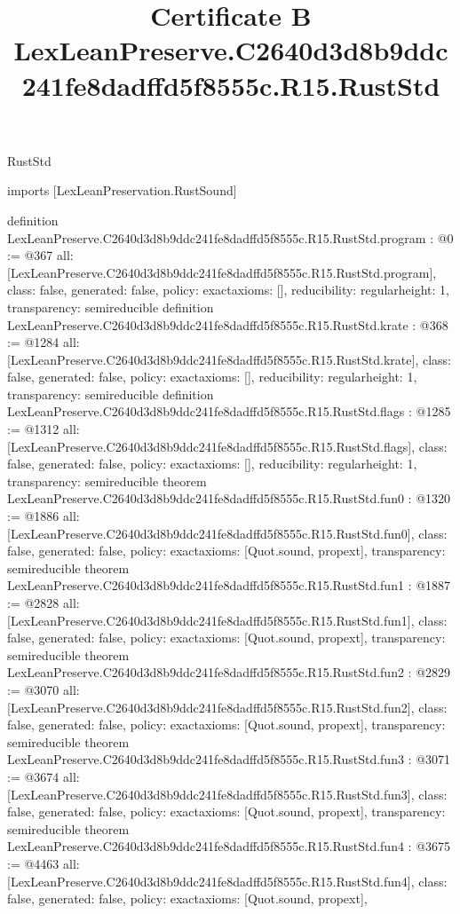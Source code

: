 \begin{lexlean}{RustStd}
\title{Certificate B LexLeanPreserve.C2640d3d8b9ddc241fe8dadffd5f8555c.R15.RustStd}
\begin{coremodule}
imports [LexLeanPreservation.RustSound]

definition LexLeanPreserve.C2640d3d8b9ddc241fe8dadffd5f8555c.R15.RustStd.program : @0 := @367 {
  all: [LexLeanPreserve.C2640d3d8b9ddc241fe8dadffd5f8555c.R15.RustStd.program],
  class: false,
  generated: false,
  policy: exact{axioms: []},
  reducibility: regular{height: 1},
  transparency: semireducible
}
definition LexLeanPreserve.C2640d3d8b9ddc241fe8dadffd5f8555c.R15.RustStd.krate : @368 := @1284 {
  all: [LexLeanPreserve.C2640d3d8b9ddc241fe8dadffd5f8555c.R15.RustStd.krate],
  class: false,
  generated: false,
  policy: exact{axioms: []},
  reducibility: regular{height: 1},
  transparency: semireducible
}
definition LexLeanPreserve.C2640d3d8b9ddc241fe8dadffd5f8555c.R15.RustStd.flags : @1285 := @1312 {
  all: [LexLeanPreserve.C2640d3d8b9ddc241fe8dadffd5f8555c.R15.RustStd.flags],
  class: false,
  generated: false,
  policy: exact{axioms: []},
  reducibility: regular{height: 1},
  transparency: semireducible
}
theorem LexLeanPreserve.C2640d3d8b9ddc241fe8dadffd5f8555c.R15.RustStd.fun0 : @1320 := @1886 {
  all: [LexLeanPreserve.C2640d3d8b9ddc241fe8dadffd5f8555c.R15.RustStd.fun0],
  class: false,
  generated: false,
  policy: exact{axioms: [Quot.sound, propext]},
  transparency: semireducible
}
theorem LexLeanPreserve.C2640d3d8b9ddc241fe8dadffd5f8555c.R15.RustStd.fun1 : @1887 := @2828 {
  all: [LexLeanPreserve.C2640d3d8b9ddc241fe8dadffd5f8555c.R15.RustStd.fun1],
  class: false,
  generated: false,
  policy: exact{axioms: [Quot.sound, propext]},
  transparency: semireducible
}
theorem LexLeanPreserve.C2640d3d8b9ddc241fe8dadffd5f8555c.R15.RustStd.fun2 : @2829 := @3070 {
  all: [LexLeanPreserve.C2640d3d8b9ddc241fe8dadffd5f8555c.R15.RustStd.fun2],
  class: false,
  generated: false,
  policy: exact{axioms: [Quot.sound, propext]},
  transparency: semireducible
}
theorem LexLeanPreserve.C2640d3d8b9ddc241fe8dadffd5f8555c.R15.RustStd.fun3 : @3071 := @3674 {
  all: [LexLeanPreserve.C2640d3d8b9ddc241fe8dadffd5f8555c.R15.RustStd.fun3],
  class: false,
  generated: false,
  policy: exact{axioms: [Quot.sound, propext]},
  transparency: semireducible
}
theorem LexLeanPreserve.C2640d3d8b9ddc241fe8dadffd5f8555c.R15.RustStd.fun4 : @3675 := @4463 {
  all: [LexLeanPreserve.C2640d3d8b9ddc241fe8dadffd5f8555c.R15.RustStd.fun4],
  class: false,
  generated: false,
  policy: exact{axioms: [Quot.sound, propext]},
}
\end{coremodule}
\end{lexlean}
